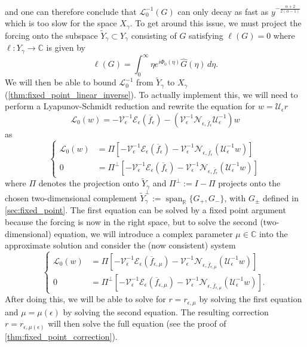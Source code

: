 \documentclass[11pt]{amsart}
\theoremstyle{definition}
\theoremstyle{remark}
\numberwithin{equation}{section}
\newcommand{\sq}[1]{\widetilde{#1}}
\newcommand{\R}{\mathbb{R}}
\newcommand{\C}{\mathbb{C}}
\newcommand{\mc}[1]{\mathcal{#1}}
\newcommand{\ov}[1]{\overline{#1}}
\begin{document}
and one can therefore conclude that $\mc{L}_0^{-1}(G)$ can only decay as fast as $y^{- \frac{\alpha + 2}{2(\alpha - 1)}}$ which is too slow for the space $X_\gamma$. To get around this issue, we must project the forcing onto the subspace $\sq{Y}_\gamma \subset Y_\gamma$ consisting of $G$ satisfying $\ell(G) = 0$ where $\ell: Y_\gamma \to \C$ is given by
\[\ell(G) = \int_{0}^{\infty}\eta e^{i\Phi_0(\eta)}\widehat{G}(\eta) \, d\eta.\]
We will then be able to bound $\mc{L}_0^{-1}$ from $\sq{Y}_\gamma$ to $X_\gamma$ (\cref{thm:fixed_point_linear_inverse}). To actually implement this, we will need to perform a Lyapunov-Schmidt reduction and rewrite the equation for $w = \mc{U}_\epsilon r$
\[\mc{L}_0(w) = -\mc{V}_\epsilon^{-1}\mc{E}_\epsilon(\ov{f}_\epsilon) - (\mc{V}_\epsilon^{-1} \mc{N}_{\epsilon,\ov{f}_\epsilon}\mc{U}_\epsilon^{-1})w\]
as
\[\begin{cases}
    \mc{L}_0(w) & = \Pi\left[-\mc{V}_\epsilon^{-1}\mc{E}_\epsilon(\ov{f}_{\epsilon}) - \mc{V}_\epsilon^{-1}\mc{N}_{\epsilon, \ov{f}_{\epsilon}}(\mc{U}_\epsilon^{-1}w)\right] \\
    0 & = \Pi^{\perp}\left[-\mc{V}_\epsilon^{-1}\mc{E}_\epsilon(\ov{f}_{\epsilon}) - \mc{V}_\epsilon^{-1}\mc{N}_{\epsilon, \ov{f}_{\epsilon}}(\mc{U}_\epsilon^{-1}w)\right]
\end{cases}\]
where $\Pi$ denotes the projection onto $\sq{Y}_\gamma$ and $\Pi^\perp:=I-\Pi$ projects onto the chosen two-dimensional complement $\sq{Y}_\gamma^{\perp}:=\operatorname{span}_{\R}\{G_+,G_-\}$, with $G_\pm$ defined in \cref{sec:fixed_point}. The first equation can be solved by a fixed point argument because the forcing is now in the right space, but to solve the second (two-dimensional) equation, we will introduce a complex parameter $\mu \in \C$ into the approximate solution and consider the (now consistent) system 
\[\begin{cases}
    \mc{L}_0(w) & = \Pi\left[-\mc{V}_\epsilon^{-1}\mc{E}_\epsilon(\ov{f}_{\epsilon, \mu}) - \mc{V}_\epsilon^{-1}\mc{N}_{\epsilon, \ov{f}_{\epsilon, \mu}}(\mc{U}_\epsilon^{-1}w)\right] \\
    0 & = \Pi^{\perp}\left[-\mc{V}_\epsilon^{-1}\mc{E}_\epsilon(\ov{f}_{\epsilon, \mu}) - \mc{V}_\epsilon^{-1}\mc{N}_{\epsilon, \ov{f}_{\epsilon, \mu}}(\mc{U}_\epsilon^{-1}w)\right].
\end{cases}\]
After doing this, we will be able to solve for $r = r_{\epsilon, \mu}$ by solving the first equation and $\mu = \mu(\epsilon)$ by solving the second equation. The resulting correction $r = r_{\epsilon, \mu(\epsilon)}$ will then solve the full equation (see the proof of \cref{thm:fixed_point_correction}).
\end{document}
